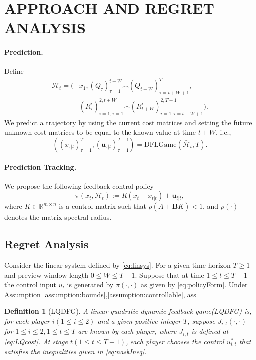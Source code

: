 \documentclass[letterpaper, 10 pt, conference]{ieeeconf}  %
\newtheorem{definition}{Definition}
\begin{document}
\section{APPROACH AND REGRET ANALYSIS}
\paragraph{Prediction. } 
Define 
\begin{equation}
\begin{split}
    \bar{\mathcal{H}}_{t} = (&\bar{x}_{1}, (Q_{\tau})_{\tau=1}^{t+W} \frown(Q_{t+W})_{\tau=t+W+1}^{T},\\
    &(R_{\tau}^{i})_{i=1,\tau=1}^{2,t+W} \frown(R_{t+W}^{i})_{i=1,\tau=t+W+1}^{2,T-1}).
\end{split}
\end{equation}
We predict a trajectory by using the current cost matrices and setting the future unknown cost matrices to be equal to the known value at time $t+W$, i.e.,
\begin{equation}
    ((x_{\tau|t})_{\tau=1}^{T},(\mathbf{u}_{\tau|t})_{\tau=1}^{T-1}) = \text{DFLGame}(\bar{\mathcal{H}}_{t},T).
\end{equation}

\paragraph{Prediction Tracking. } We propose the following feedback control policy
\begin{equation}\label{eq:policy}
    \pi(x_{t},\mathcal{H}_{t}) := \bar{K}(x_{t}-x_{t|t}) + \mathbf{u}_{t|t},
\end{equation}
where $\bar{K}\in \mathbb{R}^{m\times n}$ is a control matrix such that $\rho(A+\mathbf{B}\bar{K}) < 1$, and $\rho(\cdot)$ denotes the matrix spectral radius.


\subsection{Regret Analysis}
Consider the linear system defined by \eqref{eq:linsys}. For a given time horizon $T \geq 1$ and preview window length $0 \leq W \leq T-1$. Suppose that at time $1\leq t \leq T-1$ the control input $u_{t}$ is generated by $\pi(\cdot,\cdot)$ as given by \eqref{eq:policyForm}. Under Assumption \ref{assumption:bounds},\ref{assumption:controllable},\ref{ass}
\begin{definition}[LQDFG]\label{def:LQDFG}
    A linear quadratic dynamic feedback game(LQDFG) is, for each player $i(1\leq i\leq 2)$ and a given positive integer $T$, suppose $J_{i,t}(\cdot,\cdot)$ for $1\leq i\leq 2,1\leq t\leq T$ are known by each player, where $J_{i,t}$ is defined at \eqref{eq:LQcost}. At stage $t(1\leq t\leq T-1)$, each player chooses the control $u_{i,t}^{*}$ that satisfies the inequalities given in \eqref{eq:nashIneq}. 
\end{definition}
\end{document}
